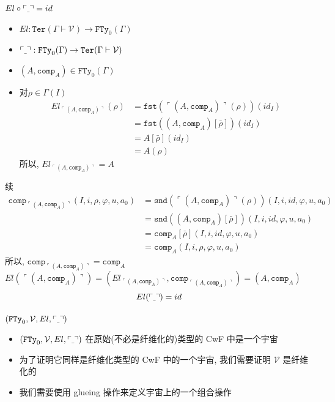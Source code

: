 \documentclass[aspectratio=169,xcolor=dvipsnames]{beamer}
\newcommand\calV{\mathcal{V}}
\newcommand\FTy{\mathtt{FTy}}
\newcommand\comp{\mathtt{comp}}
\newcommand\fst{\mathtt{fst}}
\newcommand\snd{\mathtt{snd}}
\newcommand\Ter{\mathtt{Ter}}
\newcommand{\ul}{{\scalebox{0.4}[1.0]{\_}}}
\begin{document}
\begin{frame}[shrink]{$El\circ\ulcorner\ul\urcorner=id$}
    \begin{itemize}
    \item $El: \Ter(\Gamma\vdash\calV) \to \FTy_{0}(\Gamma)$
    \item $\ulcorner\ul\urcorner : \FTy_{0}(\Gamma) \to \Ter(\Gamma\vdash\calV)$
    \item $(A,\comp_{A})\in\FTy_{0}(\Gamma)$
    \item 对$\rho\in\Gamma(I)$
    \begin{align*}
      El_{\ulcorner(A,\comp_{A})\urcorner}(\rho) &= \fst(\ulcorner(A,\comp_{A})\urcorner(\rho))(id_I)\\
      &=\fst((A,\comp_{A})[\bar{\rho}])(id_I)\\
      &=A[\bar{\rho}](id_I)\\
      &=A(\rho)
    \end{align*}
    所以, $El_{\ulcorner(A,\comp_{A})\urcorner} = A$
    \end{itemize}
\end{frame}

\begin{frame}[shrink]{续}
  \begin{align*}
    \comp_{\ulcorner(A,\comp_{A})\urcorner}(I,i,\rho,\varphi,u,a_0) &=\snd(\ulcorner(A,\comp_{A})\urcorner(\rho))(I,i,id,\varphi,u,a_0)\\
    &=\snd((A,\comp_{A})[\bar{\rho}])(I,i,id,\varphi,u,a_0)\\
    &=\comp_{A}[\bar{\rho}](I,i,id,\varphi,u,a_0)\\
    &=\comp_{A}(I,i,\rho,\varphi,u,a_0)
  \end{align*}
  所以, $\comp_{\ulcorner(A,\comp_{A})\urcorner} = \comp_{A}$\\
  $El(\ulcorner(A,\comp_{A})\urcorner) = (El_{\ulcorner(A,\comp_{A})\urcorner},\comp_{\ulcorner(A,\comp_{A})\urcorner})=(A,\comp_{A})$
  \[ El(\ulcorner\ul\urcorner) = id \]
\end{frame}

\begin{frame}[shrink]{$(\FTy_{0},\calV,El,\ulcorner\ul\urcorner)$}\begin{itemize}
  \item $(\FTy_{0},\calV,El,\ulcorner\ul\urcorner)$ 在原始(不必是纤维化的)类型的 CwF 中是一个宇宙
  \item 为了证明它同样是纤维化类型的 CwF 中的一个宇宙, 我们需要证明 $\calV$ 是纤维化的
  \item 我们需要使用 glueing 操作来定义宇宙上的一个组合操作
\end{itemize}
\end{frame}
\end{document}
